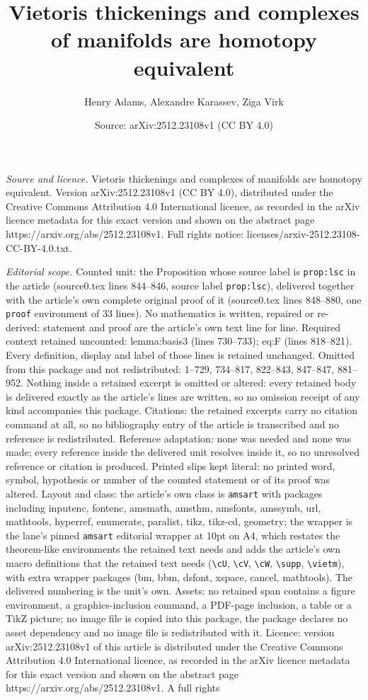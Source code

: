 \documentclass[10pt,a4paper]{amsart}
\title[Vietoris thickenings and complexes of manifolds are homotopy]{Vietoris thickenings and complexes of manifolds are homotopy equivalent}
\author{Henry Adams, Alexandre Karassev, Ziga Virk}
\date{Source: arXiv:2512.23108v1 (CC BY 4.0)}
\begin{document}
\maketitle

\noindent\emph{Source and licence.} Vietoris thickenings and complexes of manifolds are homotopy equivalent. Version arXiv:2512.23108v1 (CC BY 4.0), distributed under the Creative Commons Attribution 4.0 International licence, as recorded in the arXiv licence metadata for this exact version and shown on the abstract page https://arxiv.org/abs/2512.23108v1. Full rights notice: licenses/arxiv-2512.23108-CC-BY-4.0.txt.\par\smallskip

\noindent\textit{Editorial scope.} Counted unit: the Proposition whose source label is \texttt{prop:lsc} in the article (source0.tex lines 844--846, source label \texttt{prop:lsc}), delivered together with the article's own complete original proof of it (source0.tex lines 848--880, one \texttt{proof} environment of 33 lines). No mathematics is written, repaired or re-derived: statement and proof are the article's own text line for line. Required context retained uncounted: lemma:basis3 (lines 730--733); eq:F (lines 818--821). Every definition, display and label of those lines is retained unchanged. Omitted from this package and not redistributed: 1--729, 734--817, 822--843, 847--847, 881--952. Nothing inside a retained excerpt is omitted or altered: every retained body is delivered exactly as the article's lines are written, so no omission receipt of any kind accompanies this package. Citations: the retained excerpts carry no citation command at all, so no bibliography entry of the article is transcribed and no reference is redistributed. Reference adaptation: none was needed and none was made; every reference inside the delivered unit resolves inside it, so no unresolved reference or citation is produced. Printed slips kept literal: no printed word, symbol, hypothesis or number of the counted statement or of its proof was altered. Layout and class: the article's own class is \texttt{amsart} with packages including inputenc, fontenc, amsmath, amsthm, amsfonts, amssymb, url, mathtools, hyperref, enumerate, paralist, tikz, tikz-cd, geometry; the wrapper is the lane's pinned \texttt{amsart} editorial wrapper at 10pt on A4, which restates the theorem-like environments the retained text needs and adds the article's own macro definitions that the retained text needs (\texttt{\textbackslash cU}, \texttt{\textbackslash cV}, \texttt{\textbackslash cW}, \texttt{\textbackslash supp}, \texttt{\textbackslash vietm}), with extra wrapper packages (bm, bbm, dsfont, xspace, cancel, mathtools). The delivered numbering is the unit's own. Assets: no retained span contains a figure environment, a graphics-inclusion command, a PDF-page inclusion, a table or a TikZ picture; no image file is copied into this package, the package declares no asset dependency and no image file is redistributed with it. Licence: version arXiv:2512.23108v1 of this article is distributed under the Creative Commons Attribution 4.0 International licence, as recorded in the arXiv licence metadata for this exact version and shown on the abstract page https://arxiv.org/abs/2512.23108v1. A full rights 
\end{document}
